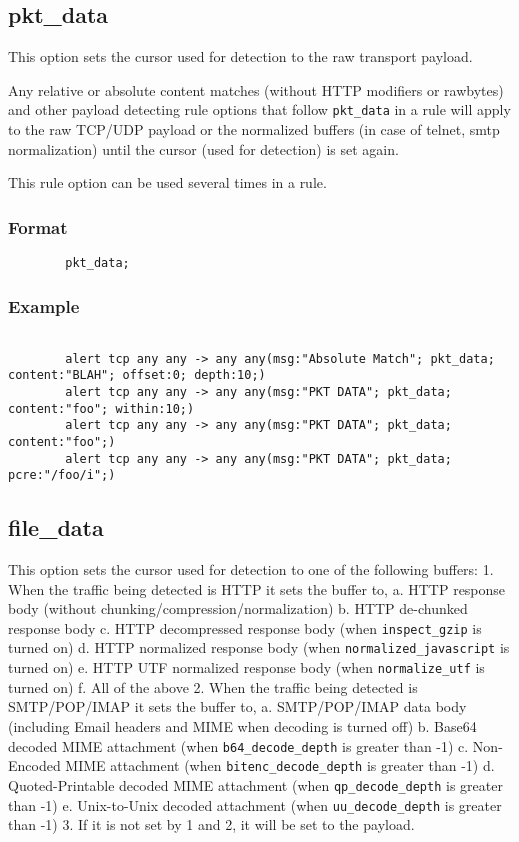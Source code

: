 \documentclass[english]{report}
\begin{document}
\subsection{pkt\_data}
\label{sub:pkt_data}
This option sets the cursor used for detection to the raw transport payload.

Any relative or absolute content matches (without HTTP modifiers or rawbytes) and other 
payload detecting rule options that follow \texttt{pkt\_data} in a rule will apply to the 
raw TCP/UDP payload or the normalized buffers (in case of telnet, smtp normalization) until 
the cursor (used for detection) is set again.

This rule option can be used several times in a rule.

\subsubsection{Format}

\begin{verbatim}
        pkt_data;
\end{verbatim}

\subsubsection{Example}

\begin{verbatim}
        
        alert tcp any any -> any any(msg:"Absolute Match"; pkt_data; content:"BLAH"; offset:0; depth:10;)
        alert tcp any any -> any any(msg:"PKT DATA"; pkt_data; content:"foo"; within:10;)
        alert tcp any any -> any any(msg:"PKT DATA"; pkt_data; content:"foo";)
        alert tcp any any -> any any(msg:"PKT DATA"; pkt_data; pcre:"/foo/i";)

\end{verbatim}

\subsection{file\_data}
\label{sub:file_data}
This option sets the cursor used for detection to one of the following buffers:
1. When the traffic being detected is HTTP it sets the buffer to,
	a. HTTP response body (without chunking/compression/normalization)
	b. HTTP de-chunked response body
	c. HTTP decompressed response body (when \texttt{inspect\_gzip} is turned on)
	d. HTTP normalized response body (when \texttt{normalized\_javascript} is turned on)
	e. HTTP UTF normalized response body (when \texttt{normalize\_utf} is turned on)
	f. All of the above
2. When the traffic being detected is SMTP/POP/IMAP it sets the buffer to,
	a. SMTP/POP/IMAP data body (including Email headers and MIME when decoding
	   is turned off)
        b. Base64 decoded MIME attachment (when \texttt{b64\_decode\_depth} is greater than -1)
	c. Non-Encoded MIME attachment (when \texttt{bitenc\_decode\_depth} is greater than -1)
	d. Quoted-Printable decoded MIME attachment (when \texttt{qp\_decode\_depth} is greater than -1) 
	e. Unix-to-Unix decoded attachment (when \texttt{uu\_decode\_depth} is greater than -1)
3. If it is not set by 1 and 2, it will be set to the payload.
\end{document}
